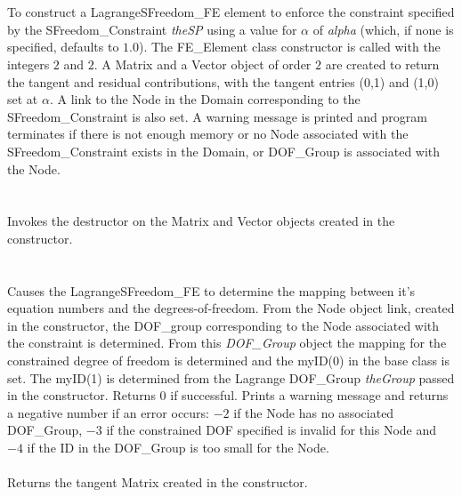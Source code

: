   \\
\\
To construct a LagrangeSFreedom\_FE element to enforce the constraint
specified by the SFreedom\_Constraint {\em theSP} using a value for
$\alpha$ of {\em alpha} (which, if none is specified, defaults to
$1.0$). The FE\_Element class constructor is called with 
the integers $2$ and $2$. A Matrix and a Vector object of order $2$
are created to return the tangent and residual contributions, with the
tangent entries (0,1) and (1,0) set at $\alpha$. A link to the Node in the Domain
corresponding to the SFreedom\_Constraint is also set. A warning message is
printed and program terminates if there is not enough memory or no
Node associated with the SFreedom\_Constraint exists in the Domain, or
DOF\_Group is associated with the Node.\\

  \\
  \\
Invokes the destructor on the Matrix and Vector objects created in the
constructor. \\

  \\
 \\
Causes the LagrangeSFreedom\_FE to determine the mapping between it's equation
numbers and the degrees-of-freedom. From the Node object link, created
in the constructor, the DOF\_group corresponding to the Node
associated with the constraint is determined. From this {\em
DOF\_Group} object the mapping for the constrained degree of freedom
is determined and the myID(0) in the base class is set. The myID(1) is
determined from the Lagrange DOF\_Group {\em theGroup} passed in the
constructor. Returns $0$ if 
successful. Prints a warning message and returns a negative number if
an error occurs: $-2$ if the
Node has no associated DOF\_Group, $-3$ if the constrained DOF
specified is invalid for this Node and $-4$ if the ID in the
DOF\_Group is too small for the Node. \\ 

 \\
Returns the tangent Matrix created in the constructor. \\

